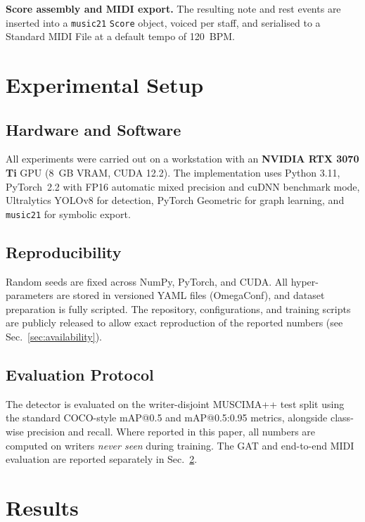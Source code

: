 \documentclass[conference]{IEEEtran}
\begin{document}
\textbf{Score assembly and MIDI export.} The resulting note and rest events
are inserted into a \texttt{music21} \texttt{Score} object, voiced per staff,
and serialised to a Standard MIDI File at a default tempo of 120~BPM.

\section{Experimental Setup}\label{sec:experiments}
\subsection{Hardware and Software}
All experiments were carried out on a workstation with an
\textbf{NVIDIA RTX 3070 Ti} GPU (8~GB VRAM, CUDA 12.2). The implementation
uses Python 3.11, PyTorch~2.2 with FP16 automatic mixed precision and
cuDNN benchmark mode, Ultralytics YOLOv8 for detection, PyTorch
Geometric for graph learning, and \texttt{music21} for symbolic export.

\subsection{Reproducibility}
Random seeds are fixed across NumPy, PyTorch, and CUDA. All hyper-parameters
are stored in versioned YAML files (OmegaConf), and dataset preparation is
fully scripted. The repository, configurations, and training scripts are
publicly released to allow exact reproduction of the reported numbers (see
Sec.~\ref{sec:availability}).

\subsection{Evaluation Protocol}
The detector is evaluated on the writer-disjoint MUSCIMA++ test split using
the standard COCO-style mAP@0.5 and mAP@0.5:0.95 metrics, alongside
class-wise precision and recall. Where reported in this paper, all numbers
are computed on writers \emph{never seen} during training. The GAT and
end-to-end MIDI evaluation are reported separately in
Sec.~\ref{sec:results}.

\section{Results}\label{sec:results}
\end{document}

